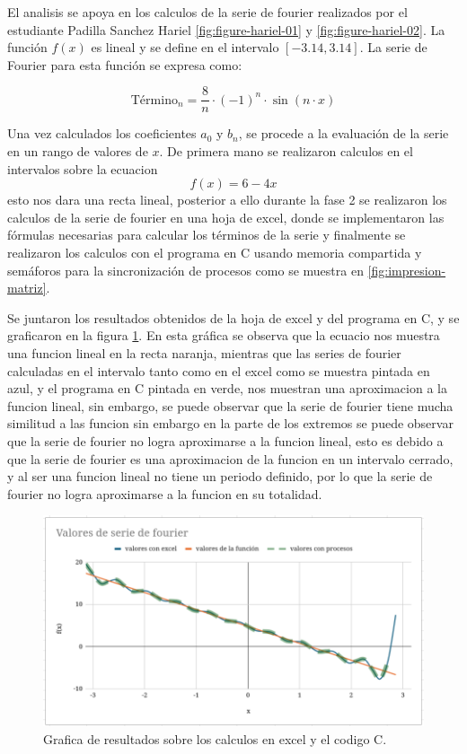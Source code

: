 {El analisis se apoya en los calculos de la serie de fourier realizados por el estudiante Padilla Sanchez Hariel \ref{fig:figure-hariel-01} y \ref{fig:figure-hariel-02}. La función \(f(x)\) es lineal y se define en el intervalo \([-3.14, 3.14]\). La serie de Fourier para esta función se expresa como:

\[\text{Término}_n = \frac{8}{n} \cdot (-1)^n \cdot \sin(n \cdot x)\]

Una vez calculados los coeficientes \(a_0\) y \(b_n\), se procede a la evaluación de la serie en un rango de valores de \(x\). De primera mano se realizaron calculos en el intervalos sobre la ecuacion \[f(x) = 6 - 4x\] esto nos dara una recta lineal, posterior a ello durante la fase 2 se realizaron los calculos de la serie de fourier en una hoja de excel, donde se implementaron las fórmulas necesarias para calcular los términos de la serie y finalmente se realizaron los calculos con el programa en C usando memoria compartida y semáforos para la sincronización de procesos como se muestra en \ref{fig:impresion-matriz}.

Se juntaron los resultados obtenidos de la hoja de excel y del programa en C, y se graficaron en la figura \ref{fig:grafica-fase3}. En esta gráfica se observa que la ecuacio nos muestra una funcion lineal en la recta naranja, mientras que las series de fourier calculadas en el intervalo tanto como en el excel como se muestra pintada en azul, y el programa en C pintada en verde, nos muestran una aproximacion a la funcion lineal, sin embargo, se puede observar que la serie de fourier tiene mucha similitud a las funcion sin embargo en la parte de los extremos se puede observar que la serie de fourier no logra aproximarse a la funcion lineal, esto es debido a que la serie de fourier es una aproximacion de la funcion en un intervalo cerrado, y al ser una funcion lineal no tiene un periodo definido, por lo que la serie de fourier no logra aproximarse a la funcion en su totalidad.

\begin{figure}[H]
    \centering
    \includegraphics[width=0.9\linewidth]{Figures/fase3/grafica_fase3.png}
    \caption[Grafica de resultados sobre los calculos en excel y el codigo C.]{Grafica de resultados sobre los calculos en excel y el codigo C.}
    \label{fig:grafica-fase3}
\end{figure}

}
